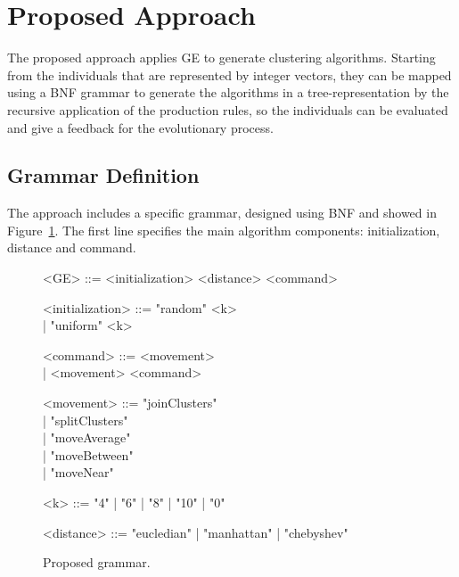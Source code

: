 \documentclass[conference]{IEEEtran}
\begin{document}
	
	\section{Proposed Approach} \label{sec:methodology}
	
	
	The proposed approach applies GE to generate clustering algorithms. Starting from the individuals that are represented by integer vectors, they can be mapped using a BNF grammar to generate the algorithms in a tree-representation by the recursive application of the production rules, so the individuals can be evaluated and give a feedback for the evolutionary process.
	
	
	\subsection{Grammar Definition}
	
	The approach includes a specific grammar, designed  using  BNF and showed in Figure~\ref{gr:proposed_grammar}. The first line specifies the main algorithm components: initialization, distance and command. 
	
	
	\begin{figure}[!htb]
		\begin{center}
			\begin{grammar}
				<GE> ::= <initialization> <distance> <command>
				
				<initialization> ::= "random" <k> \\| "uniform" <k>
				
				<command> ::= <movement> \\| <movement> <command>
				
				<movement> ::= "joinClusters" \\| "splitClusters" \\| "moveAverage" \\| "moveBetween" \\| "moveNear"
				
				<k> ::= "4" | "6" | "8" | "10" | "0"
				
				<distance> ::= "eucledian" | "manhattan" | "chebyshev"
			\end{grammar}
		\end{center}
		\caption{Proposed grammar.}
		\label{gr:proposed_grammar}
	\end{figure}
	
\end{document}
